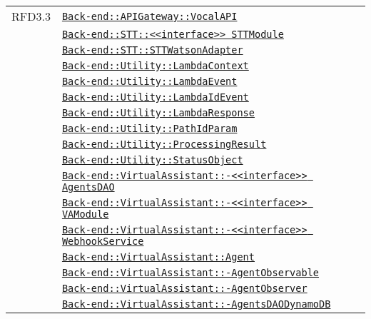 \begin{longtable}{|>{\centering}m{3cm}|m{10cm}<{\centering}|}
RFD3.3 & \hyperref[Back-end::APIGateway::VocalAPI]{\texttt{Back-end::APIGateway::VocalAPI}}\\
& \hyperref[Back-end::STT::<<interface>> STTModule]{\texttt{Back-end::STT::<<interface>> STTModule}}\\
& \hyperref[Back-end::STT::STTWatsonAdapter]{\texttt{Back-end::STT::STTWatsonAdapter}}\\
& \hyperref[Back-end::Utility::LambdaContext]{\texttt{Back-end::Utility::LambdaContext}}\\
& \hyperref[Back-end::Utility::LambdaEvent]{\texttt{Back-end::Utility::LambdaEvent}}\\
& \hyperref[Back-end::Utility::LambdaIdEvent]{\texttt{Back-end::Utility::LambdaIdEvent}}\\
& \hyperref[Back-end::Utility::LambdaResponse]{\texttt{Back-end::Utility::LambdaResponse}}\\
& \hyperref[Back-end::Utility::PathIdParam]{\texttt{Back-end::Utility::PathIdParam}}\\
& \hyperref[Back-end::Utility::ProcessingResult]{\texttt{Back-end::Utility::ProcessingResult}}\\
& \hyperref[Back-end::Utility::StatusObject]{\texttt{Back-end::Utility::StatusObject}}\\
& \hyperref[Back-end::VirtualAssistant::<<interface>> AgentsDAO]{\texttt{Back-end::VirtualAssistant::-\linebreak <<interface>> AgentsDAO}}\\
& \hyperref[Back-end::VirtualAssistant::<<interface>> VAModule]{\texttt{Back-end::VirtualAssistant::-\linebreak <<interface>> VAModule}}\\
& \hyperref[Back-end::VirtualAssistant::<<interface>> WebhookService]{\texttt{Back-end::VirtualAssistant::-\linebreak <<interface>> WebhookService}}\\
& \hyperref[Back-end::VirtualAssistant::Agent]{\texttt{Back-end::VirtualAssistant::Agent}}\\
& \hyperref[Back-end::VirtualAssistant::AgentObservable]{\texttt{Back-end::VirtualAssistant::-\linebreak AgentObservable}}\\
& \hyperref[Back-end::VirtualAssistant::AgentObserver]{\texttt{Back-end::VirtualAssistant::-\linebreak AgentObserver}}\\
& \hyperref[Back-end::VirtualAssistant::AgentsDAODynamoDB]{\texttt{Back-end::VirtualAssistant::-\linebreak AgentsDAODynamoDB}}\\

\end{longtable}
